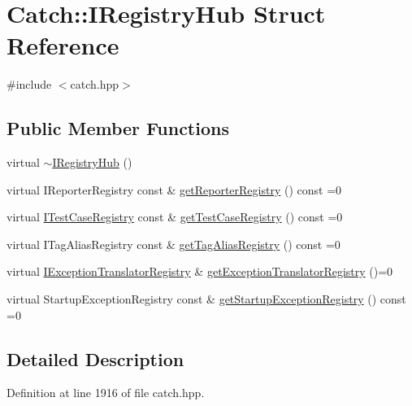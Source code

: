 \hypertarget{struct_catch_1_1_i_registry_hub}{}\section{Catch\+:\+:I\+Registry\+Hub Struct Reference}
\label{struct_catch_1_1_i_registry_hub}


{\ttfamily \#include $<$catch.\+hpp$>$}

\subsection*{Public Member Functions}
\begin{DoxyCompactItemize}
\item 
virtual \mbox{\hyperlink{struct_catch_1_1_i_registry_hub_a050de0f27f96888c8b410992146c9a09}{$\sim$\+I\+Registry\+Hub}} ()
\item 
virtual I\+Reporter\+Registry const  \& \mbox{\hyperlink{struct_catch_1_1_i_registry_hub_a55534563f7ecf7e20ec1e37285ebe54d}{get\+Reporter\+Registry}} () const =0
\item 
virtual \mbox{\hyperlink{struct_catch_1_1_i_test_case_registry}{I\+Test\+Case\+Registry}} const  \& \mbox{\hyperlink{struct_catch_1_1_i_registry_hub_af4f6255f0c0f8f1f179fa9d7d4843076}{get\+Test\+Case\+Registry}} () const =0
\item 
virtual I\+Tag\+Alias\+Registry const  \& \mbox{\hyperlink{struct_catch_1_1_i_registry_hub_a3c511b1d33e5a6d95c333a0ff387df1a}{get\+Tag\+Alias\+Registry}} () const =0
\item 
virtual \mbox{\hyperlink{struct_catch_1_1_i_exception_translator_registry}{I\+Exception\+Translator\+Registry}} \& \mbox{\hyperlink{struct_catch_1_1_i_registry_hub_a3606988da110c016c5af3ae63454eb78}{get\+Exception\+Translator\+Registry}} ()=0
\item 
virtual Startup\+Exception\+Registry const  \& \mbox{\hyperlink{struct_catch_1_1_i_registry_hub_a00281210628e6c616aca1d3e0d84db04}{get\+Startup\+Exception\+Registry}} () const =0
\end{DoxyCompactItemize}


\subsection{Detailed Description}


Definition at line 1916 of file catch.\+hpp.




